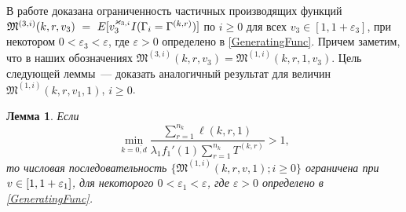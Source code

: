 \documentclass[12pt]{extarticle}
\theoremstyle{theorem}
\newtheorem{lemma}{Лемма}
\theoremstyle{remark}
\renewcommand*{\hm}[1]{#1\nobreak\discretionary{}%
	{\hbox{$\mathsurround=0pt #1$}}{}}%
\begin{document}
В работе \cite{Kocheganov:2017:1} доказана ограниченность частичных производящих функций $\mathfrak{M}^{(3,i)}(k,r,v_3)~\hm= ~E[v_3^{\varkappa_{3,i}}{I(\Gamma_{i}=\Gamma^{(k,r)})}]$ по $i\geqslant 0$ для всех $v_3\in [1,1+\varepsilon_3]$, при некотором $0 < \varepsilon_3 < \varepsilon$, где $\varepsilon>0$ определено в \eqref{GeneratingFunc}. Причем заметим, что в наших обозначениях $\mathfrak{M}^{(3,i)}(k,r,v_3) =\mathfrak{M}^{(1,i)}(k,r,1,v_3) $. Цель следующей леммы~--- доказать аналогичный результат для величин $\mathfrak{M}^{(1,i)}(k,r,v_1,1)$, $i\geqslant 0$.
\begin{lemma}
Если 
$$
\min_{k=\overline{0,d}} { \frac{\sum_{r = 1}^{n_k} \ell(k,r,1) }{\lambda_1 f_1'(1) \sum_{r=1}^{n_k} T^{(k,r)} }}>1,
$$
то числовая последовательность $\{\mathfrak{M}^{(1,i)}(k,r,v,1); i\geqslant 0\}$ ограничена при $v \hm\in [1, 1+\varepsilon_1]$, для некоторого $ 0 < \varepsilon_1 < \varepsilon$, где $\varepsilon>0$ определено в \eqref{GeneratingFunc}.
\label{generating:1:limited}
\end{lemma}
\end{document}
